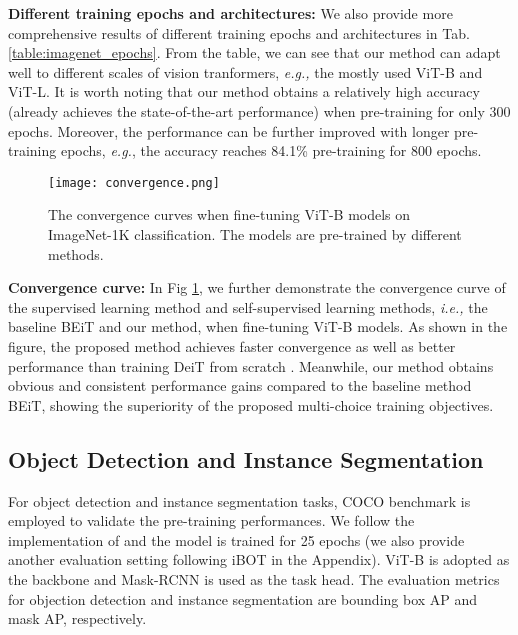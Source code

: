 \documentclass[runningheads]{llncs}
\begin{document}
\noindent\textbf{Different training epochs and architectures:} We also provide more comprehensive results of different training epochs and architectures in Tab. \ref{table:imagenet_epochs}. From the table, we can see that our method can adapt well to different scales of vision tranformers, \textit{e.g.,} the mostly used ViT-B and ViT-L. It is worth noting that our method obtains a relatively high accuracy (already achieves the state-of-the-art performance) when pre-training for only 300 epochs. Moreover, the performance can be further improved with longer pre-training epochs, \textit{e.g.}, the accuracy reaches 84.1\% pre-training for 800 epochs. 


\begin{figure}[t]
\begin{center}
\texttt{[image: convergence.png]}
\caption{The convergence curves when fine-tuning ViT-B models on ImageNet-1K classification. The models are pre-trained by different methods.}
\label{fig:conver}
\end{center}
\end{figure}


\noindent\textbf{Convergence curve:} In Fig \ref{fig:conver}, we further demonstrate the convergence curve of the supervised learning method and self-supervised learning methods, \textit{i.e.,} the baseline BEiT and our method, when fine-tuning ViT-B models. As shown in the figure, the proposed method achieves faster convergence as well as better performance than training DeiT from scratch \cite{deit}. Meanwhile, our method obtains obvious and consistent performance gains compared to the baseline method BEiT, showing the superiority of the proposed multi-choice training objectives.



\subsection{Object Detection and Instance Segmentation}
For object detection and instance segmentation tasks, COCO \cite{coco} benchmark is employed to validate the pre-training performances. 
We follow the implementation of \cite{benchmarking,mimdet} and the model is trained for 25 epochs (we also provide another evaluation setting following iBOT \cite{ibot} in the Appendix).
ViT-B is adopted as the backbone and Mask-RCNN \cite{maskrcnn} is used as the task head. The evaluation metrics for objection detection and instance segmentation are bounding box AP and mask AP, respectively.
\end{document}

